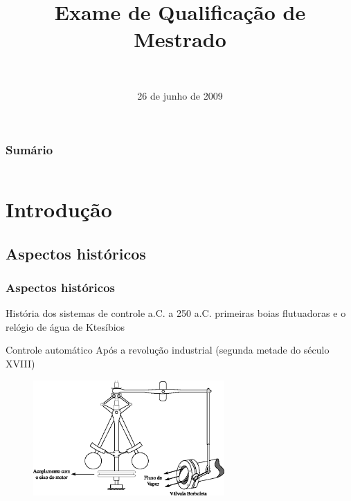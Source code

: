\documentclass{beamer}
\title[Exame de Qualificação de Mestrado]
{
    Exame de Qualificação de Mestrado
}
\subtitle{\titulo}
\author[Diogo Leite Rebouças]
{
    \autor\\
    \emailautor
}
\institute
{
    Universidade Federal do Rio Grande do Norte\\
    Programa de Pós-Graduação em Engenharia Elétrica e Computação
}
\date{26 de junho de 2009}
\begin{document}
\maketitle


\begin{frame}
    \frametitle{Sumário}
    \footnotesize
    \begin{columns}
            \tableofcontents[sections=1]
            \vspace{0.25cm}
            \tableofcontents[sections=2]
            \vspace{0.25cm}
            \tableofcontents[sections=3]
            \tableofcontents[sections=4]
            \vspace{0.25cm}
            \tableofcontents[sections=5]
    \end{columns}
\end{frame}

\section{Introdução}
\subsection{Aspectos históricos}
\begin{frame}
    \frametitle{Aspectos históricos}
    História dos sistemas de controle  a.C. a 250 a.C. \implica
    primeiras boias flutuadoras e o relógio de água de Ktesíbios

    \vspace{0.25cm}

    Controle automático \implica Após a revolução industrial (segunda metade do
    século XVIII)

\begin{figure}[htb]
\centering
    \includegraphics[width=0.65\textwidth]{imgs/introducao/eps/regulador_esferas}
\end{figure}

\end{frame}
\end{document}
